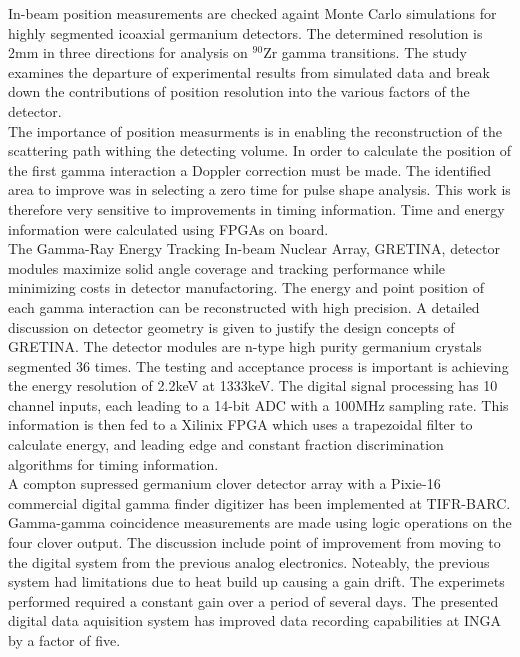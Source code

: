 \documentclass[12pt]{article}
\begin{document}
{\large\textbf{\cite{Descovich2005535}}}
In-beam position measurements are checked againt Monte Carlo simulations for highly segmented icoaxial germanium detectors. The determined resolution is 2mm in three directions for analysis on $^{90}\mbox{Zr}$ gamma transitions. The study examines the departure of experimental results from simulated data and break down the contributions of position resolution into the various factors of the detector.
\\
The importance of position measurments is in enabling the reconstruction of the scattering path withing the detecting volume. In order to calculate the position of the first gamma interaction a Doppler correction must be made. The identified area to improve was in selecting a zero time for pulse shape analysis. This work is therefore very sensitive to improvements in timing information. Time and energy information were calculated using FPGAs on board.
\\[20pt]


{\large\textbf{\cite{Paschalis201344}}}
The Gamma-Ray Energy Tracking In-beam Nuclear Array, GRETINA, detector modules maximize solid angle coverage and tracking performance while minimizing costs in detector manufactoring. The energy and point position of each gamma interaction can be reconstructed with high precision. A detailed discussion on detector geometry is given to justify the design concepts of GRETINA. The detector modules are n-type high purity germanium crystals segmented 36 times. The testing and acceptance process is important is achieving the energy resolution of 2.2keV at 1333keV. The digital signal processing has 10 channel inputs, each leading to a 14-bit ADC with a 100MHz sampling rate. This information is then fed to a Xilinix FPGA which uses a trapezoidal filter to calculate energy, and leading edge and constant fraction discrimination algorithms for timing information.
\\[20pt]


{\large\textbf{\cite{Palit201290}}}
A compton supressed germanium clover detector array with a Pixie-16 commercial digital gamma finder digitizer has been implemented at TIFR-BARC. Gamma-gamma coincidence measurements are made using logic operations on the four clover output. The discussion include point of improvement from moving to the digital system from the previous analog electronics. Noteably, the previous system had limitations due to heat build up causing a gain drift. The experimets performed required a constant gain over a period of several days. The presented digital data aquisition system has improved data recording capabilities at INGA by a factor of five.
\\[20pt]
\end{document}
